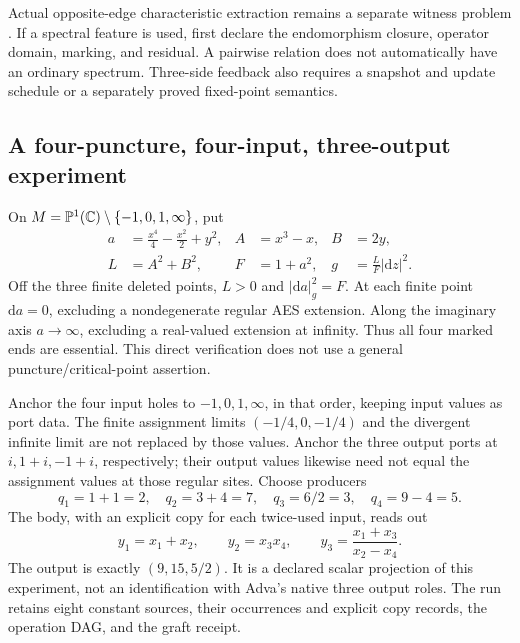 Actual opposite-edge characteristic extraction remains a separate witness
problem \cite{Yuan2026AdvaArithmeticCalibration}.  If a spectral feature is
used, first declare the endomorphism closure, operator domain, marking, and
residual.  A pairwise relation does not automatically have an ordinary
spectrum.  Three-side feedback also requires a snapshot and update schedule or
a separately proved fixed-point semantics.

\subsection{A four-puncture, four-input, three-output experiment}

\begin{example}
\label{ex:ported-four-puncture}
On $M=\mathbb{P}^1(\mathbb{C})\setminus\{-1,0,1,\infty\}$, put
\begin{align*}
  a&=\frac{x^4}{4}-\frac{x^2}{2}+y^2,
  & A&=x^3-x,& B&=2y,\\
  L&=A^2+B^2,& F&=1+a^2,& g&=\frac{L}{F}|\mathrm dz|^2.
\end{align*}
Off the three finite deleted points, $L>0$ and $|\mathrm da|_g^2=F$.
At each finite point $\mathrm da=0$, excluding a nondegenerate regular AES
extension.  Along the imaginary axis $a\to\infty$, excluding a real-valued
extension at infinity.  Thus all four marked ends are essential.  This direct
verification does not use a general puncture/critical-point assertion.

Anchor the four input holes to $-1,0,1,\infty$, in that order, keeping input
values as port data.  The finite assignment limits $(-1/4,0,-1/4)$ and the divergent infinite limit
are not replaced by those values.  Anchor the three output ports at $i,1+i,-1+i$, respectively; their output
values likewise need not equal the assignment values at those regular sites.  Choose producers
\[
  q_1=1+1=2,\quad q_2=3+4=7,\quad
  q_3=6/2=3,\quad q_4=9-4=5.
\]
The body, with an explicit copy for each twice-used input, reads out
\[
  y_1=x_1+x_2,\qquad y_2=x_3x_4,\qquad
  y_3=\frac{x_1+x_3}{x_2-x_4}.
\]
The output is exactly $(9,15,5/2)$.  It is a declared scalar projection of
this experiment, not an identification with Adva's native three output roles.
The run retains eight constant sources, their occurrences and explicit copy
records, the operation DAG, and the graft receipt.
\end{example}

